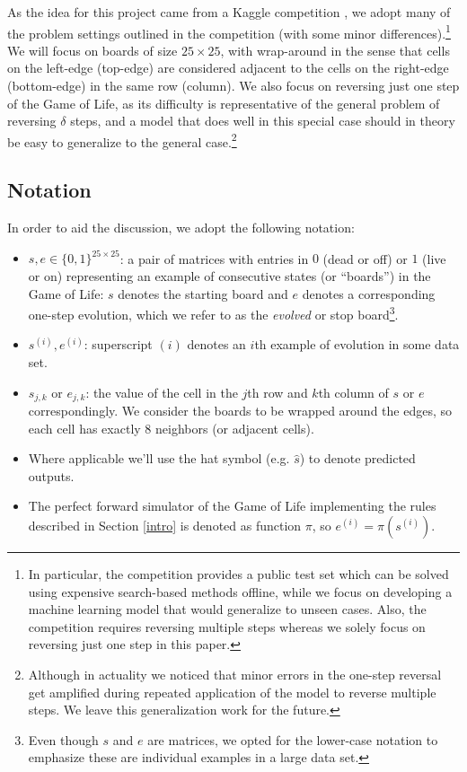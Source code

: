 \documentclass[conference]{IEEEtran}
\begin{document}
As the idea for this project came from a Kaggle competition \cite{Kaggle}, we adopt many of the problem settings outlined in the competition (with some minor differences).\footnote{In particular, the competition provides a public test set which can be solved using expensive search-based methods offline, while we focus on developing a machine learning model that would generalize to unseen cases. Also, the competition requires reversing multiple steps whereas we solely focus on reversing just one step in this paper.} \label{wraparoundboard} We will focus on boards of size $25 \times 25$, with wrap-around in the sense that cells on the left-edge (top-edge) are considered adjacent to the cells on the right-edge (bottom-edge) in the same row (column). We also focus on reversing just one step of the Game of Life, as its difficulty is representative of the general problem of reversing $\delta$ steps, and a model that does well in this special case should in theory be easy to generalize to the general case.\footnote{Although in actuality we noticed that minor errors in the one-step reversal get amplified during repeated application of the model to reverse multiple steps. We leave this generalization work for the future.}

\subsection{Notation}
In order to aid the discussion, we adopt the following notation:

\begin{itemize}
    \item $s, e \in \{0, 1\}^{25\times 25}$: a pair of matrices with entries in $0$ (dead or off) or $1$ (live or on) representing an example of consecutive states (or ``boards'') in the Game of Life: $s$ denotes the starting board and $e$ denotes a corresponding one-step evolution, which we refer to as the \emph{evolved} or stop board\footnote{Even though $s$ and $e$ are matrices, we opted for the lower-case notation to emphasize these are individual examples in a large data set.}.
    \item $s^{(i)}, e^{(i)}$: superscript $(i)$ denotes an $i$th example of evolution in some data set.
    \item $s_{j,k}$ or $e_{j,k}$: the value of the cell in the $j$th row and $k$th column of $s$ or $e$ correspondingly. We consider the boards to be wrapped around the edges, so each cell has exactly 8 neighbors (or adjacent cells).
    \item Where applicable we'll use the hat symbol (e.g. $\hat s$) to denote predicted outputs.
    \item The perfect forward simulator of the Game of Life implementing the rules described in Section \ref{intro} is denoted as function $\pi$, so $e^{(i)} = \pi(s^{(i)})$.
\end{itemize}
\end{document}
